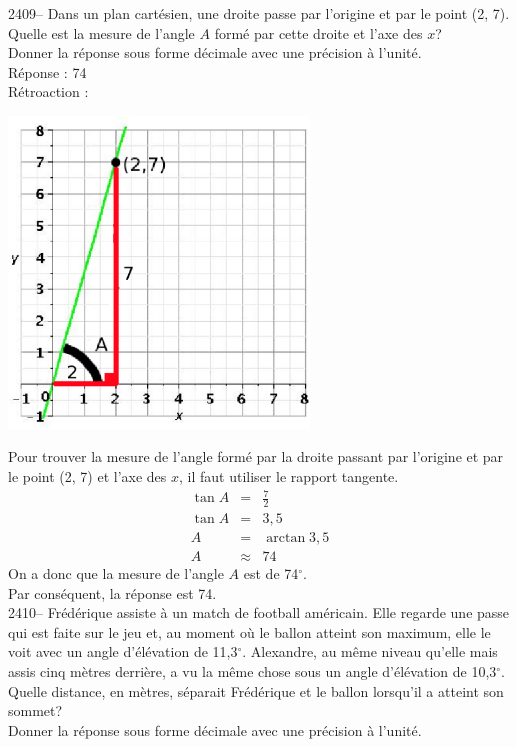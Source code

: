 \documentclass[letterpaper, 12pt]{article}
\begin{document}
2409--  Dans un plan cart\'esien, une droite passe par l'origine et par le point (2, 7). Quelle est la mesure de l'angle $A$ form\'e par cette droite et l'axe des $x$?\\
Donner la r\'eponse sous forme d\'ecimale avec une pr\'ecision \`a l'unit\'e.\\

R\'eponse : 74\\

R\'etroaction :\\
\begin{center}
 \includegraphics[width=8cm,bb=14 14 582 582]{Q2409a.eps}
\end{center}
Pour trouver la mesure de l'angle form\'e par la droite passant par l'origine et par le point (2, 7) et l'axe des $x$, il faut utiliser le rapport tangente.
\begin{eqnarray*}
 \tan{A}&=&\frac{7}{2}\\[2mm]
 \tan{A}&=&3,5\\
 A&=&\arctan{3,5}\\
 A&\approx&74
\end{eqnarray*}
On a donc que la mesure de l'angle $A$ est de 74$^{\circ}$.\\
Par cons\'equent, la r\'eponse est 74.\\

2410-- Fr\'ed\'erique assiste \`a un match de football am\'ericain. Elle regarde une passe qui est faite sur le jeu et, au moment o\`u le ballon atteint son maximum, elle le voit avec un angle d'\'el\'evation de  11,3$^{\circ}$. Alexandre, au m\^eme niveau qu'elle mais assis cinq m\`etres derri\`ere, a vu la m\^eme chose sous un angle d'\'el\'evation de  10,3$^{\circ}$. Quelle distance, en m\`etres, s\'eparait Fr\'ed\'erique et le ballon lorsqu'il a atteint son sommet?\\
Donner la r\'eponse sous forme d\'ecimale avec une pr\'ecision \`a l'unit\'e.\\
\end{document}
